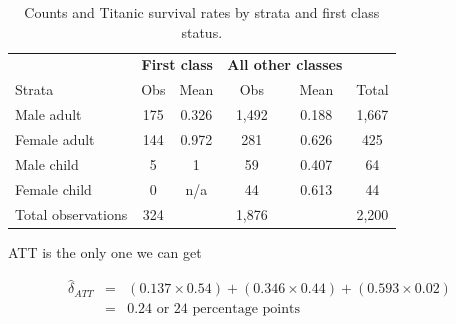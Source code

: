 \documentclass{beamer}
\begin{document}
\begin{frame}

\begin{table}\small{}
\caption{Counts and Titanic survival rates by strata and first class status.}
\centering
\begin{tabular}{lcc|cc|c}
\toprule
\multicolumn{1}{c}{\textbf{}}&
\multicolumn{2}{c}{\textbf{First class}}&
\multicolumn{2}{c}{\textbf{All other classes}}&
\multicolumn{1}{c}{\textbf{}}\\
\multicolumn{1}{l}{Strata}&
\multicolumn{1}{c}{Obs}&
\multicolumn{1}{c}{Mean}&
\multicolumn{1}{c}{Obs}&
\multicolumn{1}{c}{Mean}&
\multicolumn{1}{c}{Total}\\
\midrule
Male adult		& 175	& 0.326	& 1,492	& 0.188	& 1,667 \\
Female adult	& 144	& 0.972	& 281	& 0.626	& 425 \\
Male child		& 5		& 1		& 59		& 0.407 	& 64\\
Female child	& 0		& n/a		& 44		& 0.613 	& 44\\
\midrule
Total	observations	& 324	&&	1,876	 && 2,200\\
\bottomrule
\end{tabular}
\label{tab:titanic-counts2}
\end{table}

\end{frame}

\begin{frame}{ATT is the only one we can get}

\begin{eqnarray}
\widehat{\delta}_{ATT} &=& (0.137 \times 0.54) + (0.346 \times 0.44) + (0.593 \times 0.02)  \nonumber \\
&=& 0.24\text{ or 24 percentage points}
\end{eqnarray}

\end{frame}
\end{document}

